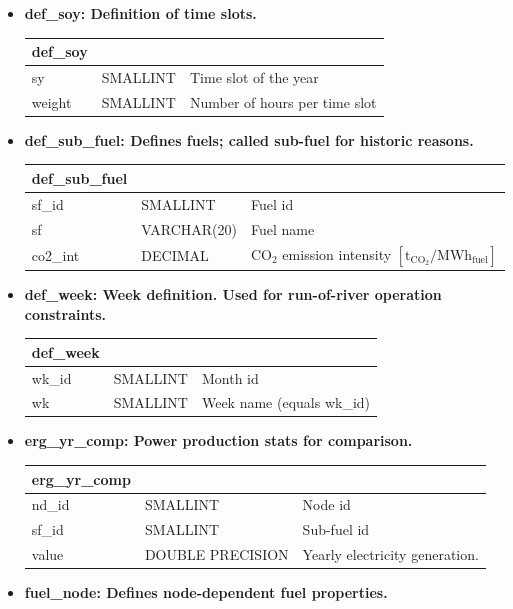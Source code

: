 \documentclass[]{article}
\begin{document}
\begin{itemize}
\item \textbf{def\_soy: Definition of time slots.}

\begin{tabular}{@{}lll@{}}
\toprule
def\_soy & & \\
\midrule
sy & SMALLINT & Time slot of the year \\
weight & SMALLINT & Number of hours per time slot \\
\bottomrule
\end{tabular}

\item \textbf{def\_sub\_fuel: Defines fuels; called sub-fuel for historic reasons.}

\begin{tabular}{@{}lll@{}}
\toprule
def\_sub\_fuel & & \\
\midrule
sf\_id & SMALLINT & Fuel id \\
sf & VARCHAR(20) & Fuel name \\
co2\_int & DECIMAL & $\mathrm{CO_2}$ emission intensity $[\mathrm{t_{CO_2}/MWh_{fuel}}]$ \\
\bottomrule
\end{tabular}

\item \textbf{def\_week: Week definition. Used for run-of-river operation constraints.}

\begin{tabular}{@{}lll@{}}
\toprule
def\_week & & \\
\midrule
wk\_id & SMALLINT & Month id \\
wk & SMALLINT & Week name (equals wk\_id) \\
\bottomrule
\end{tabular}

\item \textbf{erg\_yr\_comp: Power production stats for comparison.}

\begin{tabular}{@{}lll@{}}
\toprule
erg\_yr\_comp & & \\
\midrule
nd\_id & SMALLINT & Node id \\
sf\_id & SMALLINT & Sub-fuel id \\
value & DOUBLE PRECISION & Yearly electricity generation. \\
\bottomrule
\end{tabular}

\item \textbf{fuel\_node: Defines node-dependent fuel properties.}


\end{itemize}
\end{document}
